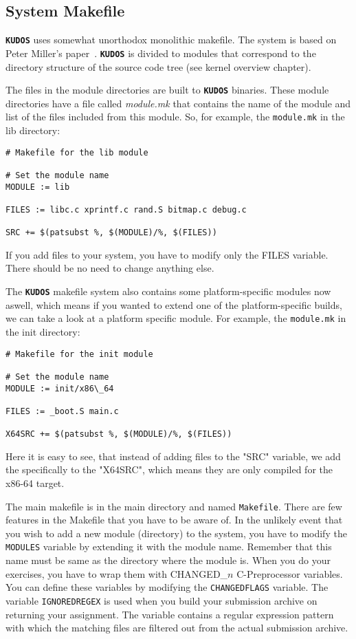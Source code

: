 \documentclass[twoside,a4paper]{report}
\newcommand{\kudos}{\texttt{\textbf{KUDOS}}}
\begin{document}
\subsection{System Makefile}

\kudos{} uses somewhat unorthodox monolithic makefile. The system
is based on Peter Miller's paper~\cite{miller}. \kudos{} is divided
to modules that correspond to the directory structure of the source
code tree (see kernel overview chapter).


The files in the module directories are built to \kudos{} binaries.
These module directories have a file called \textit{module.mk} that
contains the name of the module and list of the files included from
this module. So, for example, the \texttt{module.mk} in the lib
directory:
\begin{verbatim}
# Makefile for the lib module

# Set the module name
MODULE := lib

FILES := libc.c xprintf.c rand.S bitmap.c debug.c

SRC += $(patsubst %, $(MODULE)/%, $(FILES))
\end{verbatim}

If you add files to your system, you have to modify only the FILES
variable. There should be no need to change anything else.

The \kudos{} makefile system also contains some platform-specific modules now aswell,
which means if you wanted to extend one of the platform-specific builds, we can take a
look at a platform specific module. For example, the \texttt{module.mk} in the init directory:
\begin{verbatim}
# Makefile for the init module

# Set the module name
MODULE := init/x86\_64

FILES := _boot.S main.c

X64SRC += $(patsubst %, $(MODULE)/%, $(FILES))
\end{verbatim}

Here it is easy to see, that instead of adding files to the "SRC" variable, we add the specifically 
to the "X64SRC", which means they are only compiled for the x86-64 target.



The main makefile is in the main directory and named
\texttt{Makefile}. There are few features in the Makefile that you
have to be aware of. In the unlikely event that you wish to add a new
module (directory) to the system, you have to modify the
\texttt{MODULES} variable by extending it with the module name.
Remember that this name must be same as the directory where the module
is. When you do your exercises, you have to wrap them with
CHANGED\_$n$ C-Preprocessor variables. You can define these variables
by modifying the \texttt{CHANGEDFLAGS} variable. The variable
\texttt{IGNOREDREGEX} is used when you build your submission archive
on returning your assignment. The variable contains a regular
expression pattern with which the matching files are filtered out from
the actual submission archive.
\end{document}
